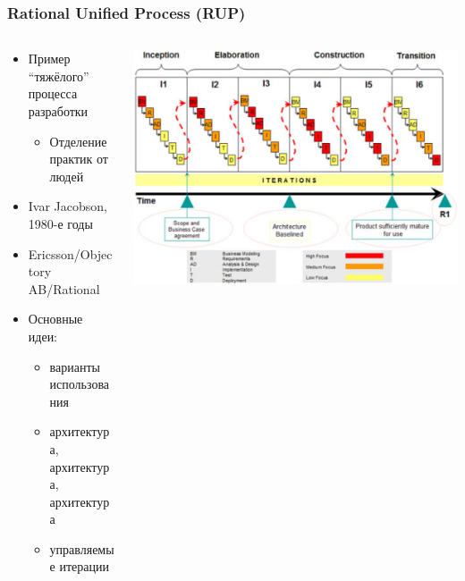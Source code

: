 \documentclass{../../slides-style}
\begin{document}
    \begin{frame}
        \frametitle{Rational Unified Process (RUP)}
        \begin{columns}
            \begin{column}{0.5\textwidth}
                \begin{itemize}
                    \item Пример ``тяжёлого'' процесса разработки
                    \begin{itemize}
                        \item Отделение практик от людей
                    \end{itemize}
                    \item Ivar Jacobson, 1980-е годы
                    \item Ericsson/Objectory AB/Rational
                    \item Основные идеи:
                    \begin{itemize}
                        \item варианты использования
                        \item архитектура, архитектура, архитектура
                        \item управляемые итерации
                    \end{itemize}
                \end{itemize}
            \end{column}
            \begin{column}{0.5\textwidth}
                \begin{center}
                    \includegraphics[width=\textwidth]{rup.png}
                \end{center}
            \end{column}
        \end{columns}
    \end{frame}
\end{document}
